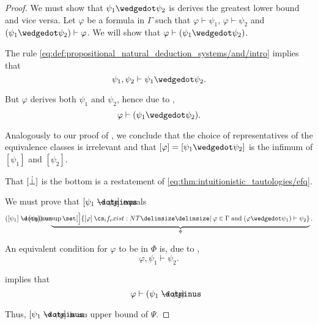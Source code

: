 \begin{proof}
  We must show that \( \psi_1 \synwedge \psi_2 \) is derives the greatest lower bound and vice versa. Let \( \varphi \) be a formula in \( \Gamma \) such that \( \varphi \vdash \psi_1 \), \( \varphi \vdash \psi_2 \) and \( (\psi_1 \synwedge \psi_2) \vdash \varphi \). We will show that \( \varphi \vdash (\psi_1 \synwedge \psi_2) \).

  The rule \eqref{eq:def:propositional_natural_deduction_systems/and/intro} implies that
  \begin{equation*}
    \psi_1, \psi_2 \vdash \psi_1 \synwedge \psi_2.
  \end{equation*}

  But \( \varphi \) derives both \( \psi_1 \) and \( \psi_2 \), hence due to ,
  \begin{equation*}
    \varphi \vdash (\psi_1 \synwedge \psi_2).
  \end{equation*}

  Analogously to our proof of , we conclude that the choice of representatives of the equivalence classes is irrelevant and that \( [\varphi] = [\psi_1 \synwedge \psi_2] \) is the infimum of \( [\psi_1] \) and \( [\psi_2] \).

   That \( [\dot\bot] \) is the bottom is a restatement of \eqref{eq:thm:intuitionistic_tautologies/efq}.

   We must prove that \( [\psi_1 \synimplies \psi_2] \) equals
  \begin{equation*}
    ([\psi_1] \synimplies [\psi_2]) = \underbrace{\sup\set[\Big]{ [\varphi] \given* \varphi \in \Gamma \T{and} (\varphi \synwedge \psi_1) \vdash \psi_2 }}_{\Phi}.
  \end{equation*}

  An equivalent condition for \( \varphi \) to be in \( \Phi \) is, due to ,
  \begin{equation*}
    \varphi, \psi_1 \vdash \psi_2.
  \end{equation*}

   implies that
  \begin{equation*}
    \varphi \vdash (\psi_1 \synimplies \psi_2).
  \end{equation*}

  Thus, \( [\psi_1 \synimplies \psi_2] \) is an upper bound of \( \Psi \).


\end{proof}
